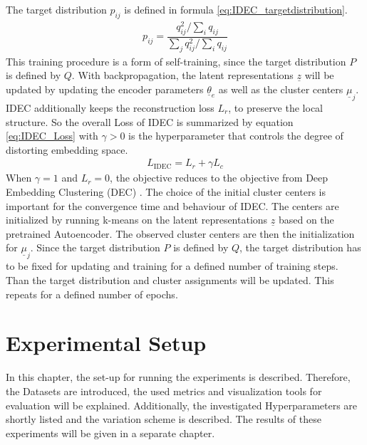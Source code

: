 \documentclass[12pt,DIV14,BCOR12mm,a4paper,footexclude,headinclude,halfparskip-,twoside,openright,openany,cleardoubleempty,idxtotoc,bibtotoc]{scrreprt} %
\numberwithin{equation}{chapter}
\begin{document}
The target distribution $p_{ij}$ is defined in formula \ref{eq:IDEC_targetdistribution}.
\begin{align}
	p_{ij}=\dfrac{q_{ij}^{2}/\sum_i q_{ij}}{\sum_j q_{ij}^{2}/\sum_i q_{ij}}\label{eq:IDEC_targetdistribution}
\end{align}
This training procedure is a form of self-training, since the target distribution $P$ is defined by $Q$. With backpropagation, the latent representations $\underline{z}$ will be updated by updating the encoder parameters $\underline{\theta}_e$ as well as the cluster centers $\underline{\mu}_j$. IDEC additionally keeps the reconstruction loss $L_r$, to preserve the local structure. So the overall Loss of IDEC is summarized by equation \ref{eq:IDEC_Loss} with $\gamma > 0 $ is the hyperparameter that controls the degree of distorting embedding space.
\begin{align}
	L_{\textrm{IDEC}} = L_{r} + \gamma L_c\label{eq:IDEC_Loss}
\end{align}
When $\gamma = 1$ and $L_r = 0 $, the objective reduces to the objective from Deep Embedding Clustering (DEC) \cite{Xie16DEC}. The choice of the initial cluster centers is important for the convergence time and behaviour of IDEC. The centers are initialized by running k-means on the latent representations $\underline{z}$ based on the pretrained Autoencoder. The observed cluster centers are then the initialization for $\underline{\mu}_j$. Since the target distribution $P$ is defined by $Q$, the target distribution has to be fixed for updating and training for a defined number of training steps. Than the target distribution and cluster assignments will be updated. This repeats for a defined number of epochs.
\chapter{Experimental Setup}
In this chapter, the set-up for running the experiments is described. Therefore, the Datasets are introduced, the used metrics and visualization tools for evaluation will be explained. Additionally, the investigated Hyperparameters are shortly listed and the variation scheme is described. The results of these experiments will be given in a separate chapter.
\end{document}
